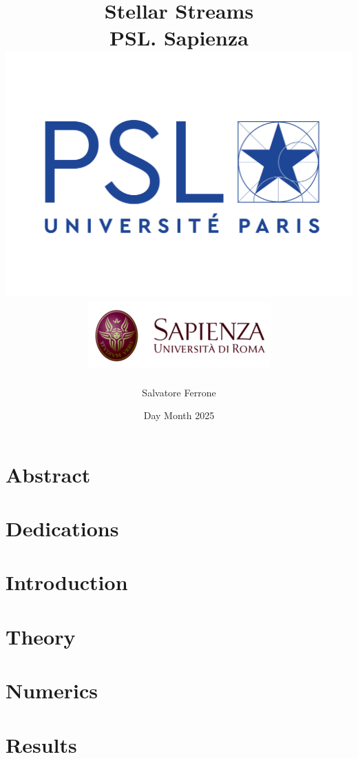 \documentclass[12pt]{report}
\title{
{Stellar Streams}\\
{\large PSL. Sapienza}\\
{\includegraphics[width=0.5\linewidth]{LOGO-PSL-nov-2017.png}}
{\includegraphics[width=0.6\linewidth]{Uniroma1.png}}
}
\author{Salvatore Ferrone}
\date{Day Month 2025}
\begin{document}
\maketitle

\chapter*{Abstract}

\chapter*{Dedications}

\tableofcontents

\chapter{Introduction}


\chapter{Theory}


\chapter{Numerics}


\chapter{Results}





\end{document}
